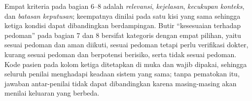 \begin{table}[htbp]
\vspace{0.4em}
{\tabnotestyle Empat kriteria pada bagian 6--8 adalah \emph{relevansi}, \emph{kejelasan}, \emph{kecukupan konteks}, dan \emph{batasan keputusan}; keempatnya dinilai pada satu kisi yang sama sehingga ketiga kondisi dapat dibandingkan berdampingan. Butir ``kesesuaian terhadap pedoman'' pada bagian 7 dan 8 bersifat kategoris dengan empat pilihan, yaitu sesuai pedoman dan aman diikuti, sesuai pedoman tetapi perlu verifikasi dokter, kurang sesuai pedoman dan berpotensi berisiko, serta tidak sesuai pedoman. Kode pasien pada kolom ketiga ditetapkan di muka dan wajib dipakai, sehingga seluruh penilai menghadapi keadaan sistem yang sama; tanpa pematokan itu, jawaban antar-penilai tidak dapat dibandingkan karena masing-masing akan menilai keluaran yang berbeda.\par}
\end{table}
